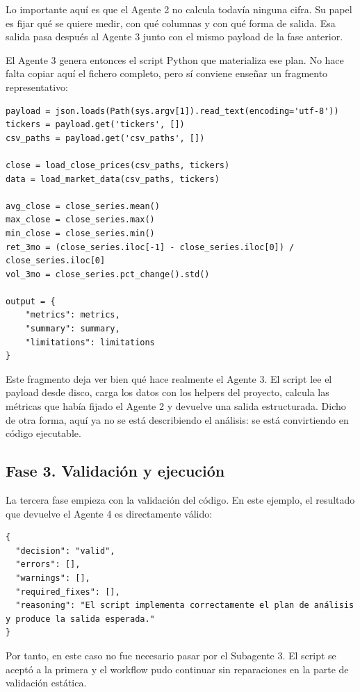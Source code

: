 Lo importante aqu\'i es que el Agente 2 no calcula todav\'ia ninguna cifra. Su papel es fijar qu\'e se quiere medir, con qu\'e columnas y con qu\'e forma de
salida. Esa salida pasa despu\'es al Agente 3 junto con el mismo payload de la fase anterior.

El Agente 3 genera entonces el script Python que materializa ese plan. No hace falta copiar aqu\'i el fichero completo, pero s\'i conviene ense\~nar un
fragmento representativo:

\begin{lstlisting}[style=traceblock]
payload = json.loads(Path(sys.argv[1]).read_text(encoding='utf-8'))
tickers = payload.get('tickers', [])
csv_paths = payload.get('csv_paths', [])

close = load_close_prices(csv_paths, tickers)
data = load_market_data(csv_paths, tickers)

avg_close = close_series.mean()
max_close = close_series.max()
min_close = close_series.min()
ret_3mo = (close_series.iloc[-1] - close_series.iloc[0]) / close_series.iloc[0]
vol_3mo = close_series.pct_change().std()

output = {
    "metrics": metrics,
    "summary": summary,
    "limitations": limitations
}
\end{lstlisting}

Este fragmento deja ver bien qu\'e hace realmente el Agente 3. El script lee el payload desde disco, carga los datos con los helpers del proyecto, calcula las
m\'etricas que hab\'ia fijado el Agente 2 y devuelve una salida estructurada. Dicho de otra forma, aqu\'i ya no se est\'a describiendo el an\'alisis: se est\'a
convirtiendo en c\'odigo ejecutable.

\subsection{Fase 3. Validaci\'on y ejecuci\'on}

La tercera fase empieza con la validaci\'on del c\'odigo. En este ejemplo, el resultado que devuelve el Agente 4 es directamente v\'alido:

\begin{lstlisting}[style=traceblock]
{
  "decision": "valid",
  "errors": [],
  "warnings": [],
  "required_fixes": [],
  "reasoning": "El script implementa correctamente el plan de análisis y produce la salida esperada."
}
\end{lstlisting}

Por tanto, en este caso no fue necesario pasar por el Subagente 3. El script se acept\'o a la primera y el workflow pudo continuar sin reparaciones en la parte
de validaci\'on est\'atica.

